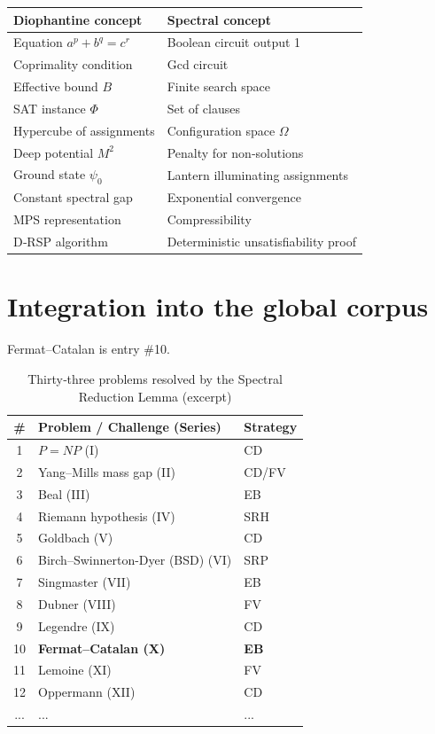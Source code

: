 \documentclass[11pt,a4paper]{article}
\begin{document}
\begin{center}
\small
\begin{tabular}{@{}l|l@{}}
\toprule
\textbf{Diophantine concept} & \textbf{Spectral concept} \\
\midrule
Equation $a^p + b^q = c^r$ & Boolean circuit output 1 \\
Coprimality condition & Gcd circuit \\
Effective bound $B$ & Finite search space \\
SAT instance $\Phi$ & Set of clauses \\
Hypercube of assignments & Configuration space $\Omega$ \\
Deep potential $M^2$ & Penalty for non‑solutions \\
Ground state $\psi_0$ & Lantern illuminating assignments \\
Constant spectral gap & Exponential convergence \\
MPS representation & Compressibility \\
D‑RSP algorithm & Deterministic unsatisfiability proof \\
\bottomrule
\end{tabular}
\end{center}

\section{Integration into the global corpus}

Fermat–Catalan is entry \#10.

\begin{center}
\small
\begin{longtable}{@{}cll@{}}
\caption{Thirty‑three problems resolved by the Spectral Reduction Lemma (excerpt)}\\
\toprule
\# & Problem / Challenge (Series) & Strategy \\
\midrule
1 & \(P = NP\) (I) & CD \\
2 & Yang–Mills mass gap (II) & CD/FV \\
3 & Beal (III) & EB \\
4 & Riemann hypothesis (IV) & SRH \\
5 & Goldbach (V) & CD \\
6 & Birch–Swinnerton-Dyer (BSD) (VI) & SRP \\
7 & Singmaster (VII) & EB \\
8 & Dubner (VIII) & FV \\
9 & Legendre (IX) & CD \\
10 & \textbf{Fermat–Catalan (X)} & \textbf{EB} \\
11 & Lemoine (XI) & FV \\
12 & Oppermann (XII) & CD \\
... & ... & ... \\
\bottomrule
\end{longtable}
\end{center}
\end{document}
